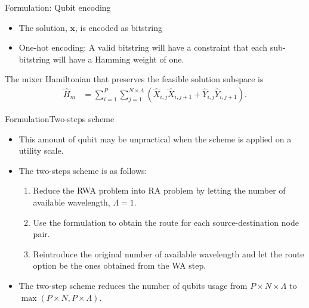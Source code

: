\begin{frame}{Formulation: Qubit encoding}
\begin{itemize}
    \item The solution, $\boldsymbol{x}$, is encoded as bitstring
    \item One-hot encoding: A valid bitstring will have a constraint that each sub-bitstring will have a Hamming weight of one.
\end{itemize}
    
The mixer Hamiltonian that preserves the feasible solution subspace is \begin{align}
	\hat{H}_{m} &= \sum_{i = 1}^{{P}}
	\sum_{j = 1}^{N \times {\Lambda}}
	(\hat{X}_{i,j}\hat{X}_{i, j+1}+\hat{Y}_{i,j}\hat{Y}_{i, j+1}) .
\end{align}
\end{frame}

\begin{frame}{Formulation}{Two-steps scheme}
    \begin{itemize}
\item This amount of qubit may be unpractical when the scheme is applied on a utility scale.
\item The two-steps scheme is as follows:\begin{enumerate}
	\item Reduce the RWA problem into RA problem by letting the number of available wavelength, ${\Lambda} = 1$.
	\item Use the formulation to obtain the route for each source-destination node pair.
	\item Reintroduce the original number of available wavelength and let the route option be the ones obtained from the WA step.
\end{enumerate}
\item The two-step scheme reduces the number of qubits usage from ${P} \times N \times {\Lambda}$ to $\max(
{P} \times N, {P}  \times {\Lambda}
)$.
    
    \end{itemize}
\end{frame}
